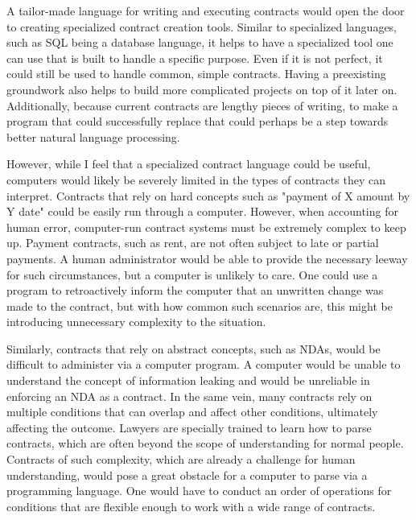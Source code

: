 \documentclass{article}
\theoremstyle{theorem}
\theoremstyle{definition}
\theoremstyle{remark}
\begin{document}
\medskip\noindent
A tailor-made language for writing and executing contracts would open the door to creating specialized contract creation tools. Similar to specialized languages, such as SQL being a database language, it helps to have a specialized tool one can use that is built to handle a specific purpose. Even if it is not perfect, it could still be used to handle common, simple contracts. Having a preexisting groundwork also helps to build more complicated projects on top of it later on. Additionally, because current contracts are lengthy pieces of writing, to make a program that could successfully replace that could perhaps be a step towards better natural language processing.

\medskip\noindent
However, while I feel that a specialized contract language could be useful, computers would likely be severely limited in the types of contracts they can interpret. Contracts that rely on hard concepts such as "payment of X amount by Y date" could be easily run through a computer. However, when accounting for human error, computer-run contract systems must be extremely complex to keep up. Payment contracts, such as rent, are not often subject to late or partial payments. A human administrator would be able to provide the necessary leeway for such circumstances, but a computer is unlikely to care. One could use a program to retroactively inform the computer that an unwritten change was made to the contract, but with how common such scenarios are, this might be introducing unnecessary complexity to the situation.

\medskip\noindent
Similarly, contracts that rely on abstract concepts, such as NDAs, would be difficult to administer via a computer program. A computer would be unable to understand the concept of information leaking and would be unreliable in enforcing an NDA as a contract. In the same vein, many contracts rely on multiple conditions that can overlap and affect other conditions, ultimately affecting the outcome. Lawyers are specially trained to learn how to parse contracts, which are often beyond the scope of understanding for normal people. Contracts of such complexity, which are already a challenge for human understanding, would pose a great obstacle for a computer to parse via a programming language. One would have to conduct an order of operations for conditions that are flexible enough to work with a wide range of contracts.
\end{document}
